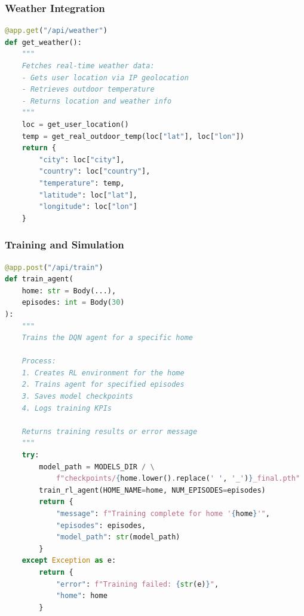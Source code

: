 \documentclass[12pt,a4paper]{article}
\begin{document}
\subsubsection{Weather Integration}

\begin{lstlisting}[language=Python, caption=Real-time weather endpoint]
@app.get("/api/weather")
def get_weather():
    """
    Fetches real-time weather data:
    - Gets user location via IP geolocation
    - Retrieves outdoor temperature
    - Returns location and weather info
    """
    loc = get_user_location()
    temp = get_real_outdoor_temp(loc["lat"], loc["lon"])
    return {
        "city": loc["city"],
        "country": loc["country"],
        "temperature": temp,
        "latitude": loc["lat"],
        "longitude": loc["lon"]
    }
\end{lstlisting}

\subsubsection{Training and Simulation}

\begin{lstlisting}[language=Python, caption=RL training endpoint]
@app.post("/api/train")
def train_agent(
    home: str = Body(...), 
    episodes: int = Body(30)
):
    """
    Trains the DQN agent for a specific home
    
    Process:
    1. Creates RL environment for the home
    2. Trains agent for specified episodes
    3. Saves model checkpoints
    4. Logs training KPIs
    
    Returns training results or error message
    """
    try:
        model_path = MODELS_DIR / \
            f"checkpoints/{home.lower().replace(' ', '_')}_final.pth"
        train_rl_agent(HOME_NAME=home, NUM_EPISODES=episodes)
        return {
            "message": f"Training complete for home '{home}'",
            "episodes": episodes,
            "model_path": str(model_path)
        }
    except Exception as e:
        return {
            "error": f"Training failed: {str(e)}",
            "home": home
        }
\end{lstlisting}
\end{document}
